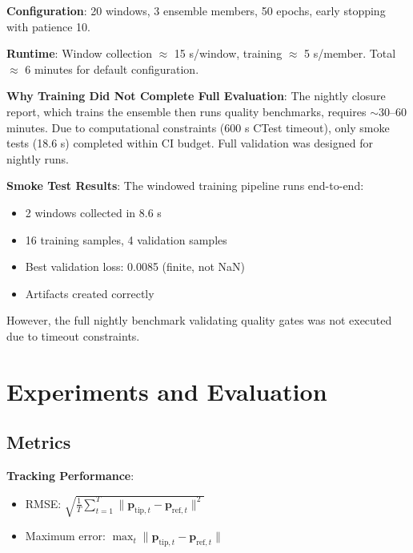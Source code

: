 \documentclass[conference]{IEEEtran}
\begin{document}
\textbf{Configuration}: 20 windows, 3 ensemble members, 50 epochs, early stopping with patience 10.

\textbf{Runtime}: Window collection $\approx$ 15 s/window, training $\approx$ 5 s/member. Total $\approx$ 6 minutes for default configuration.

\textbf{Why Training Did Not Complete Full Evaluation}: The nightly closure report, which trains the ensemble then runs quality benchmarks, requires $\sim$30--60 minutes. Due to computational constraints (600 s CTest timeout), only smoke tests (18.6 s) completed within CI budget. Full validation was designed for nightly runs.

\textbf{Smoke Test Results}: The windowed training pipeline runs end-to-end:
\begin{itemize}
\item 2 windows collected in 8.6 s
\item 16 training samples, 4 validation samples
\item Best validation loss: 0.0085 (finite, not NaN)
\item Artifacts created correctly
\end{itemize}

However, the full nightly benchmark validating quality gates was not executed due to timeout constraints.

\section{Experiments and Evaluation}

\subsection{Metrics}

\textbf{Tracking Performance}:
\begin{itemize}
\item RMSE: $\sqrt{\frac{1}{T}\sum_{t=1}^T \|\mathbf{p}_{\text{tip},t} - \mathbf{p}_{\text{ref},t}\|^2}$
\item Maximum error: $\max_t \|\mathbf{p}_{\text{tip},t} - \mathbf{p}_{\text{ref},t}\|$
\end{itemize}
\end{document}
